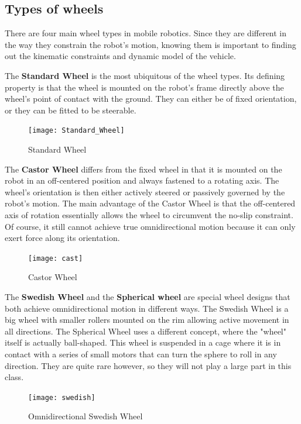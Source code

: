 \documentclass[twoside]{article}
\begin{document}
\subsection*{Types of wheels}

There are four main wheel types in mobile robotics. Since they are different in the way they constrain the robot's motion, knowing them is important to finding out the kinematic constraints and dynamic model of the vehicle.

The \textbf{Standard Wheel} is the most ubiquitous of the wheel types. Its defining property is that the wheel is mounted on the robot's frame directly above the wheel's point of contact with the ground. They can either be of fixed orientation, or they can be fitted to be steerable\cite{sns}.

\begin{figure}[H]
\centering
\texttt{[image: Standard\_Wheel]}
\caption{Standard Wheel}
\end{figure}


The \textbf{Castor Wheel} differs from the fixed wheel in that it is mounted on the robot in an off-centered position and always fastened to a rotating axis. The wheel's orientation is then either actively steered or passively governed by the robot's motion. The main advantage of the Castor Wheel is that the off-centered axis of rotation essentially allows the wheel to circumvent the no-slip constraint. Of course, it still cannot achieve true omnidirectional motion because it can only exert force along its orientation\cite{sns}.

\begin{figure}[h]
\centering
\texttt{[image: cast]}
\caption{Castor Wheel}
\end{figure}

The \textbf{Swedish Wheel} and the \textbf{Spherical wheel} are special wheel designs that both achieve omnidirectional motion in different ways. The Swedish Wheel is a big wheel with smaller rollers mounted on the rim allowing active movement in all directions\cite{sns}. The Spherical Wheel uses a different concept, where the "wheel" itself is actually ball-shaped. This wheel is suspended in a cage where it is in contact with a series of small motors that can turn the sphere to roll in any direction. They are quite rare however, so they will not play a large part in this class.

\begin{figure}[H]
\centering
\texttt{[image: swedish]}
\caption{Omnidirectional Swedish Wheel \cite{swed}}
\end{figure}
\end{document}
